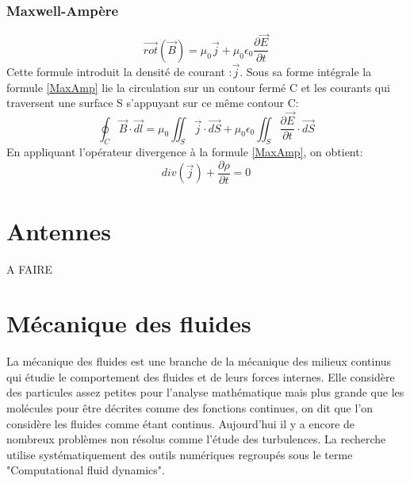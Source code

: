 \documentclass[10pt,a4paper]{article}
\begin{document}
\subsubsection{Maxwell-Ampère}
\begin{equation}
\overrightarrow{rot}(\overrightarrow{B}) = \mu_{0}\overrightarrow{j} + \mu_{0}\epsilon_{0}\frac{\partial\overrightarrow{E}}{\partial t}
\label{MaxAmp}
\end{equation}
Cette formule introduit la densité de courant :$\overrightarrow{j}$.
Sous sa forme intégrale la formule \ref{MaxAmp} lie la circulation sur un contour fermé C et les courants qui traversent une surface S s'appuyant sur ce même contour C:
\begin{equation}
\oint_{C}\overrightarrow{B}\cdot\overrightarrow{dl} = \mu_{0}\iint_{S}\overrightarrow{j}\cdot\overrightarrow{dS} + \mu_{0}\epsilon_{0}\iint_{S}\frac{\partial\overrightarrow{E}}{\partial t}\cdot\overrightarrow{dS}
\end{equation}
En appliquant l'opérateur divergence à la formule \ref{MaxAmp}, on obtient:
\begin{equation}
div(\overrightarrow{j}) + \frac{\partial \rho}{\partial t} = 0
\end{equation}


\section{Antennes}
A FAIRE



\section{Mécanique des fluides}
La mécanique des fluides est une branche de la mécanique des milieux continus qui étudie le comportement des fluides et de leurs forces internes. Elle considère des particules assez petites pour l'analyse mathématique mais plus grande que les molécules pour être décrites comme des fonctions continues, on dit que l'on considère les fluides comme étant continus. Aujourd'hui il y a encore de nombreux problèmes non résolus comme l'étude des turbulences. La recherche utilise systématiquement des outils numériques regroupés sous le terme "Computational fluid dynamics".
\end{document}
